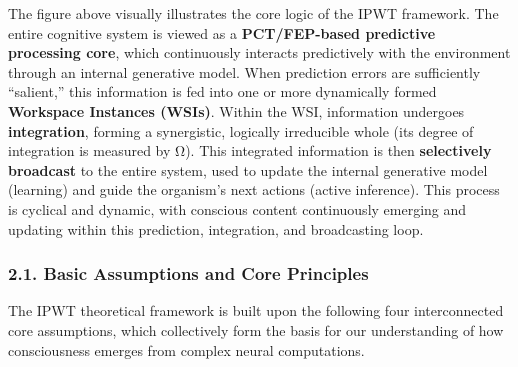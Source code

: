 \documentclass[
  a4paper]{article}
\begin{document}
The figure above visually illustrates the core logic of the IPWT
framework. The entire cognitive system is viewed as a
\textbf{PCT/FEP-based predictive processing core}, which continuously
interacts predictively with the environment through an internal
generative model. When prediction errors are sufficiently ``salient,''
this information is fed into one or more dynamically formed
\textbf{Workspace Instances (WSIs)}. Within the WSI, information
undergoes \textbf{integration}, forming a synergistic, logically
irreducible whole (its degree of integration is measured by Ω). This
integrated information is then \textbf{selectively broadcast} to the
entire system, used to update the internal generative model (learning)
and guide the organism's next actions (active inference). This process
is cyclical and dynamic, with conscious content continuously emerging
and updating within this prediction, integration, and broadcasting loop.

\subsubsection{2.1. Basic Assumptions and Core
Principles}\label{basic-assumptions-and-core-principles}

The IPWT theoretical framework is built upon the following four
interconnected core assumptions, which collectively form the basis for
our understanding of how consciousness emerges from complex neural
computations.
\end{document}

